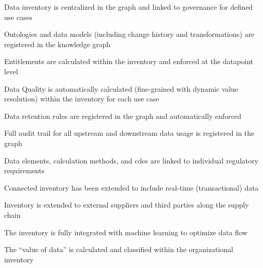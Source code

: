 \begin{scoring}

  \item Data inventory is centralized in the graph and linked to governance for defined use cases
  \item Ontologies and data models (including change history and transformations) are registered in the knowledge graph
  \item Entitlements are calculated within the inventory and enforced at the datapoint level
  \item Data Quality is automatically calculated (fine-grained with dynamic value resolution) within
        the inventory for each use case
  \item Data retention rules are registered in the graph and automatically enforced
  \item Full audit trail for all upstream and downstream data usage is registered in the graph
  \item Data elements, calculation methods, and \glspl{cde} are linked to individual regulatory requirements

\end{scoring}

\ekgmmscoringlevelFour

\begin{scoring}

  \item Connected inventory has been extended to include real-time (transactional) data
  \item Inventory is extended to external suppliers and third parties along the supply chain
  \item The inventory is fully integrated with machine learning to optimize data flow
  \item The “value of data” is calculated and classified within the organizational inventory

\end{scoring}

